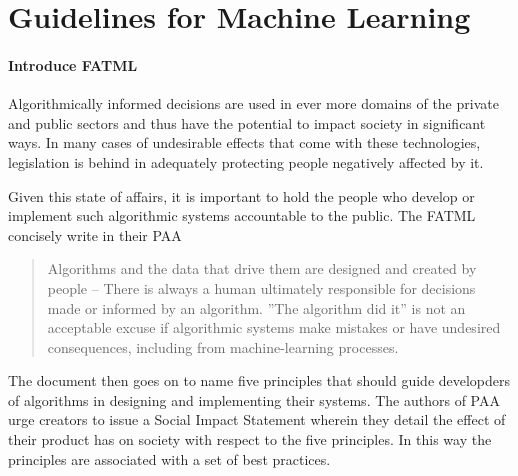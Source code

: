 \documentclass{article}
\begin{document}
\section{Guidelines for Machine Learning}\hypertarget{sec3}{}
\paragraph{Introduce FATML}
Algorithmically informed decisions are used in ever more domains of the private and public sectors and thus have the potential to impact society in significant ways. In many cases of undesirable effects that come with these technologies, legislation is behind in adequately protecting people negatively affected by it.

Given this state of affairs, it is important to hold the people who develop or implement such algorithmic systems accountable to the public. The FATML concisely write in their PAA \cite{principles}
\begin{quote}
Algorithms and the data that drive them are designed and created by people -- There is always a human ultimately responsible for decisions made or informed by an algorithm. ''The algorithm did it'' is not an acceptable excuse if algorithmic systems make mistakes or have undesired consequences, including from machine-learning processes.
\end{quote}

The document then goes on to name five principles that should guide developders of algorithms in designing and implementing their systems. The authors of PAA urge creators to issue a Social Impact Statement wherein they detail the effect of their product has on society with respect to the five principles. In this way the principles are associated with a set of best practices.
\end{document}
